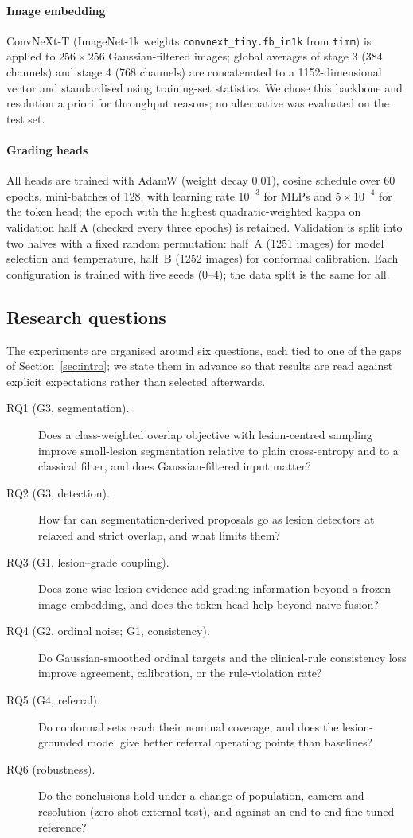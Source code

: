 \paragraph{Image embedding} ConvNeXt-T (ImageNet-1k weights \texttt{convnext\_tiny.fb\_in1k} from \texttt{timm}) is applied to $256\times256$ Gaussian-filtered images; global averages of stage 3 (384 channels) and stage 4 (768 channels) are concatenated to a 1152-dimensional vector and standardised using training-set statistics. We chose this backbone and resolution a priori for throughput reasons; no alternative was evaluated on the test set.

\paragraph{Grading heads} All heads are trained with AdamW (weight decay 0.01), cosine schedule over 60 epochs, mini-batches of 128, with learning rate $10^{-3}$ for MLPs and $5\times10^{-4}$ for the token head; the epoch with the highest quadratic-weighted kappa on validation half A (checked every three epochs) is retained. Validation is split into two halves with a fixed random permutation: half~A (1251 images) for model selection and temperature, half~B (1252 images) for conformal calibration. Each configuration is trained with five seeds (0--4); the data split is the same for all.

\subsection{Research questions}
The experiments are organised around six questions, each tied to one of the gaps of Section~\ref{sec:intro}; we state them in advance so that results are read against explicit expectations rather than selected afterwards.
\begin{description}
\item[RQ1 (G3, segmentation).] Does a class-weighted overlap objective with lesion-centred sampling improve small-lesion segmentation relative to plain cross-entropy and to a classical filter, and does Gaussian-filtered input matter?
\item[RQ2 (G3, detection).] How far can segmentation-derived proposals go as lesion detectors at relaxed and strict overlap, and what limits them?
\item[RQ3 (G1, lesion--grade coupling).] Does zone-wise lesion evidence add grading information beyond a frozen image embedding, and does the token head help beyond naive fusion?
\item[RQ4 (G2, ordinal noise; G1, consistency).] Do Gaussian-smoothed ordinal targets and the clinical-rule consistency loss improve agreement, calibration, or the rule-violation rate?
\item[RQ5 (G4, referral).] Do conformal sets reach their nominal coverage, and does the lesion-grounded model give better referral operating points than baselines?
\item[RQ6 (robustness).] Do the conclusions hold under a change of population, camera and resolution (zero-shot external test), and against an end-to-end fine-tuned reference?
\end{description}

